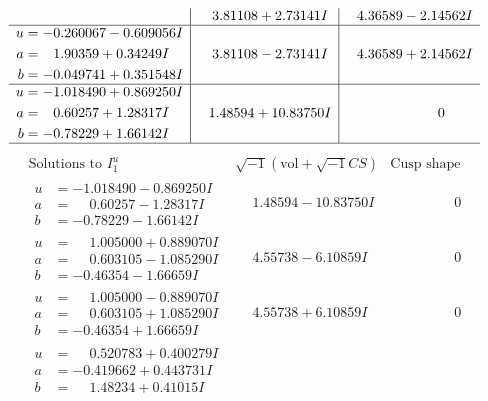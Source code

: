 \documentclass[1p]{elsarticle_modified}
\theoremstyle{definition}
\newcommand{\I}{\sqrt{-1}}
\begin{document}
$$\begin{array}{c|c|c}
 & \phantom{-}3.81108 + 2.73141 I & \phantom{-}4.36589 - 2.14562 I \\ \hline\begin{aligned}
u &= -0.260067 - 0.609056 I \\
a &= \phantom{-}1.90359 + 0.34249 I \\
b &= -0.049741 + 0.351548 I\end{aligned}
 & \phantom{-}3.81108 - 2.73141 I & \phantom{-}4.36589 + 2.14562 I \\ \hline\begin{aligned}
u &= -1.018490 + 0.869250 I \\
a &= \phantom{-}0.60257 + 1.28317 I \\
b &= -0.78229 + 1.66142 I\end{aligned}
 & \phantom{-}1.48594 + 10.83750 I & \phantom{-0.000000 } 0\\
 \hline 
 \end{array}$$\newpage$$\begin{array}{c|c|c}  
\text{Solutions to }I^u_{1}& \I (\text{vol} + \sqrt{-1}CS) & \text{Cusp shape}\\
 \hline 
\begin{aligned}
u &= -1.018490 - 0.869250 I \\
a &= \phantom{-}0.60257 - 1.28317 I \\
b &= -0.78229 - 1.66142 I\end{aligned}
 & \phantom{-}1.48594 - 10.83750 I & \phantom{-0.000000 } 0 \\ \hline\begin{aligned}
u &= \phantom{-}1.005000 + 0.889070 I \\
a &= \phantom{-}0.603105 - 1.085290 I \\
b &= -0.46354 - 1.66659 I\end{aligned}
 & \phantom{-}4.55738 - 6.10859 I & \phantom{-0.000000 } 0 \\ \hline\begin{aligned}
u &= \phantom{-}1.005000 - 0.889070 I \\
a &= \phantom{-}0.603105 + 1.085290 I \\
b &= -0.46354 + 1.66659 I\end{aligned}
 & \phantom{-}4.55738 + 6.10859 I & \phantom{-0.000000 } 0 \\ \hline\begin{aligned}
u &= \phantom{-}0.520783 + 0.400279 I \\
a &= -0.419662 + 0.443731 I \\
b &= \phantom{-}1.48234 + 0.41015 I\end{aligned}

\end{array}$$
\end{document}
